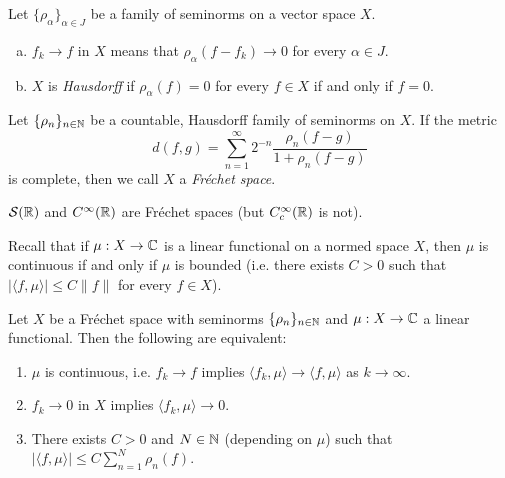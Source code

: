 \begin{definition}
  Let $\{\rho_\alpha\}_{\alpha \in J}$
  be a family of seminorms on a
  vector space $X$.
  \begin{enumerate}[(a)]
    \item $f_k \to f$ in $X$ means
      that $\rho_\alpha(f - f_k) \to 0$
      for every $\alpha \in J$.
    \item $X$ is \emph{Hausdorff}
      if $\rho_\alpha(f) = 0$ for
      every $f \in X$ if and only if
      $f = 0$.
  \end{enumerate}
\end{definition}

\begin{definition}
  Let $\{\rho_n\}_{n \in \mathbb{N}}$ be a
  countable, Hausdorff family
  of seminorms on $X$.
  If the metric
  \[
    d(f, g) = \sum_{n=1}^\infty 2^{-n} \frac{\rho_n(f-g)}{1 + \rho_n(f-g)}
  \]
  is complete, then we call
  $X$ a \emph{Fr\'echet space}.
\end{definition}

\begin{exercise}
  $\mathcal{S}(\mathbb{R})$ and
  $C^\infty(\mathbb{R})$ are Fr\'echet spaces
  (but $C_c^\infty(\mathbb{R})$ is not).
\end{exercise}

\begin{remark}
  Recall that if
  $\mu : X \to \mathbb{C}$ is a linear
  functional on a normed space $X$,
  then $\mu$ is continuous if
  and only if $\mu$ is bounded
  (i.e. there exists $C > 0$ such that
  $|\langle f, \mu \rangle| \le C \|f\|$
  for every $f \in X$).
\end{remark}

\begin{theorem}
  Let $X$ be a Fr\'echet space
  with seminorms $\{\rho_n\}_{n \in \mathbb{N}}$
  and $\mu : X \to \mathbb{C}$ a linear
  functional. Then the following
  are equivalent:
  \begin{enumerate}
    \item $\mu$ is continuous, i.e.
      $f_k \to f$ implies
      $\langle f_k, \mu \rangle \to \langle f, \mu \rangle$
      as $k \to \infty$.
    \item $f_k \to 0$ in $X$
      implies $\langle f_k, \mu \rangle \to 0$.
    \item There exists $C > 0$ 
      and $N \in \mathbb{N}$ (depending
      on $\mu$) such that
      $|\langle f, \mu \rangle| \le C \sum_{n=1}^N \rho_n(f)$.
  \end{enumerate}
\end{theorem}


